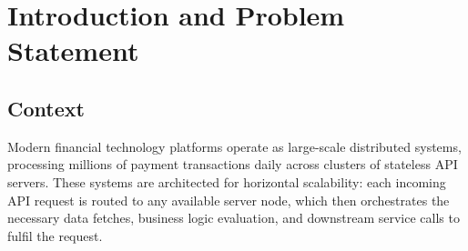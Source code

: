 \documentclass[12pt,a4paper]{report}
\begin{document}
\begin{abstract}
Distributed payment systems serving millions of daily transactions face a persistent challenge: redundant cross-node network calls that inflate tail latency, particularly at the p95 and p99 percentiles. Each API request in such systems triggers multiple lookups to remote data stores—fetching merchant configurations, routing tables, feature flags, and transaction metadata—even when much of this data is immutable within the scope of a single request or a short time window. This paper proposes a \textbf{two-tier caching strategy} consisting of (1)~a \textbf{thread-level cache} that eliminates redundant data fetches within a single request's execution context and (2)~a \textbf{server-local cache} that reduces cross-node calls for immutable, configuration-like data across concurrent requests on the same node. To ensure correctness, we define formal \textbf{cache-safety boundaries}: only data satisfying strict immutability and idempotency criteria is eligible for caching. Evaluation on a production distributed payment platform demonstrates a \textbf{4\%+ reduction in cross-node network calls} at peak traffic and measurable improvement in \textbf{p95 latency}, with zero cache-related correctness violations post-deployment. The approach is lightweight, requires no additional infrastructure, and is applicable to any stateless, multi-threaded API server architecture.
\end{abstract}

\tableofcontents
\listoffigures
\listoftables
\newpage

\chapter{Introduction and Problem Statement}

\section{Context}

Modern financial technology platforms operate as large-scale distributed systems, processing millions of payment transactions daily across clusters of stateless API servers. These systems are architected for horizontal scalability: each incoming API request is routed to any available server node, which then orchestrates the necessary data fetches, business logic evaluation, and downstream service calls to fulfil the request.
\end{document}
